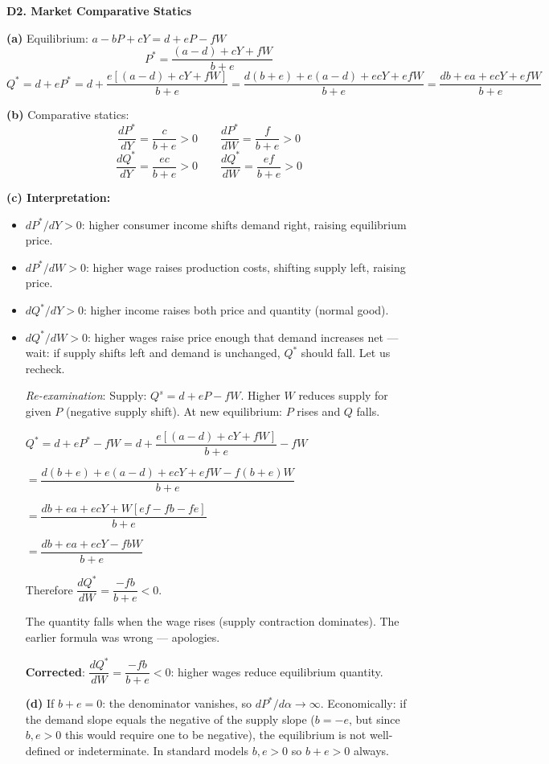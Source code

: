 \documentclass[12pt, a4paper]{article}
\theoremstyle{definition}
\newcommand{\ddd}[2]{\dfrac{d#1}{d#2}}
\begin{document}
\begin{solbox}
\textbf{D2. Market Comparative Statics}

\textbf{(a)} Equilibrium: $a-bP+cY = d+eP-fW$
\[
  P^* = \frac{(a-d)+cY+fW}{b+e}
\]
\[
  Q^* = d+eP^* = d + \frac{e[(a-d)+cY+fW]}{b+e}
      = \frac{d(b+e)+e(a-d)+ecY+efW}{b+e}
      = \frac{db+ea+ecY+efW}{b+e}
\]

\textbf{(b)} Comparative statics:
\[
  \ddd{P^*}{Y} = \frac{c}{b+e} > 0
  \qquad
  \ddd{P^*}{W} = \frac{f}{b+e} > 0
\]
\[
  \ddd{Q^*}{Y} = \frac{ec}{b+e} > 0
  \qquad
  \ddd{Q^*}{W} = \frac{ef}{b+e} > 0
\]

\textbf{(c) Interpretation:}
\begin{itemize}
  \item $dP^*/dY>0$: higher consumer income shifts demand right, raising equilibrium price.
  \item $dP^*/dW>0$: higher wage raises production costs, shifting supply left, raising price.
  \item $dQ^*/dY>0$: higher income raises both price and quantity (normal good).
  \item $dQ^*/dW>0$: higher wages raise price enough that demand increases net --- wait: if supply shifts left and demand is unchanged, $Q^*$ should fall. Let us recheck.

\emph{Re-examination}: Supply: $Q^s = d+eP-fW$. Higher $W$ reduces supply for given $P$ (negative supply shift). At new equilibrium: $P$ rises and $Q$ falls.

$Q^* = d + eP^* - fW = d + \dfrac{e[(a-d)+cY+fW]}{b+e} - fW$

$= \dfrac{d(b+e)+e(a-d)+ecY+efW - f(b+e)W}{b+e}$

$= \dfrac{db+ea+ecY + W[ef-fb-fe]}{b+e}$

$= \dfrac{db+ea+ecY - fbW}{b+e}$

Therefore $\dfrac{dQ^*}{dW} = \dfrac{-fb}{b+e} < 0$.

The quantity falls when the wage rises (supply contraction dominates). The earlier formula was wrong --- apologies.

\textbf{Corrected}:
$\dfrac{dQ^*}{dW} = \dfrac{-fb}{b+e} < 0$: higher wages reduce equilibrium quantity.

\textbf{(d)} If $b+e=0$: the denominator vanishes, so $dP^*/d\alpha\to\infty$.
Economically: if the demand slope equals the negative of the supply slope ($b=-e$, but since $b,e>0$ this would require one to be negative), the equilibrium is not well-defined or indeterminate. In standard models $b,e>0$ so $b+e>0$ always.
\end{itemize}
\end{solbox}
\end{document}
